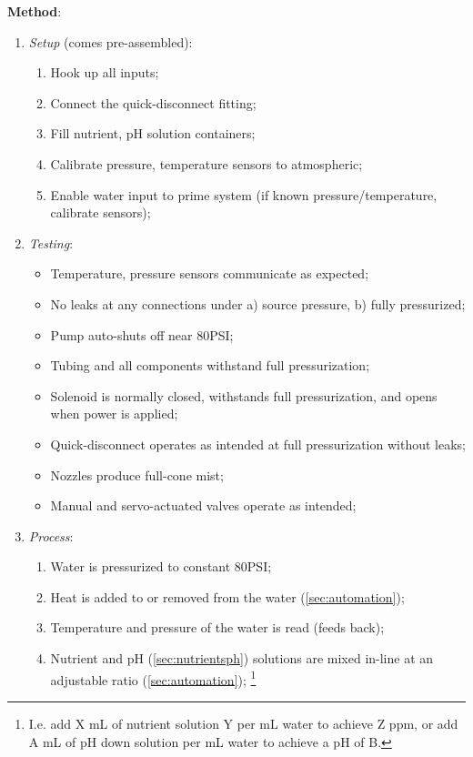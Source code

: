 \documentclass{report}
\begin{document}
\textbf{Method}:
\begin{enumerate}
    \item \textit{Setup} (comes pre-assembled):
    \begin{enumerate}
        \item Hook up all inputs;
        \item Connect the quick-disconnect fitting;
        \item Fill nutrient, pH solution containers;
        \item Calibrate pressure, temperature sensors to atmospheric;
        \item Enable water input to prime system (if known pressure/temperature, calibrate sensors);
    \end{enumerate}
    \item \textit{Testing}:
    \begin{itemize}
        \item Temperature, pressure sensors communicate as expected;
        \item No leaks at any connections under a) source pressure, b) fully pressurized;
        \item Pump auto-shuts off near 80PSI;
        \item Tubing and all components withstand full pressurization;
        \item Solenoid is normally closed, withstands full pressurization, and opens when power is applied;
        \item Quick-disconnect operates as intended at full pressurization without leaks;
        \item Nozzles produce full-cone mist;
        \item Manual and servo-actuated valves operate as intended;
    \end{itemize}
    \item \textit{Process}:
    \begin{enumerate}
        \item Water is pressurized to constant 80PSI;
        \item Heat is added to or removed from the water (\ref{sec:automation}); %
        \item Temperature and pressure of the water is read (feeds back);
        \item Nutrient and pH (\ref{sec:nutrientsph}) solutions are mixed in-line at an adjustable ratio (\ref{sec:automation}); \footnote{I.e. add X mL of nutrient solution Y per mL water to achieve Z ppm, or add A mL of pH down solution per mL water to achieve a pH of B.}

\end{enumerate}
\end{enumerate}
\end{document}
